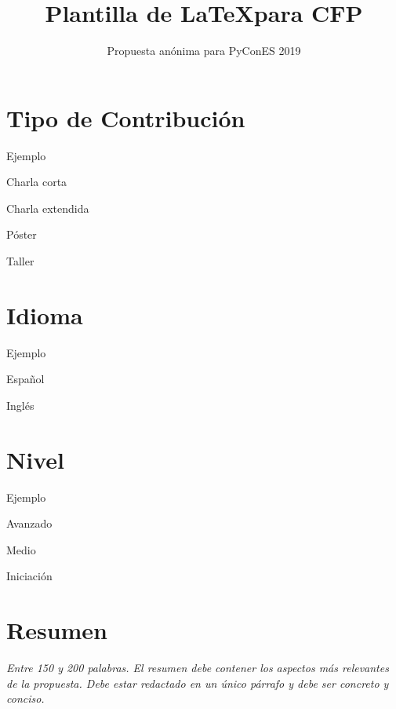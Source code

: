 \documentclass[runningheads]{llncs}
\newcommand{\cmark}{\ding{51}}%
\newcommand{\done}{\rlap{$\square$}{\raisebox{2pt}{\large\hspace{1pt}\cmark}}%
\hspace{-2.5pt}}
\begin{document}
\pagestyle{headings}
\mainmatter


\title{Plantilla de \LaTeX para CFP} %


\author{Propuesta an\'onima para PyConES 2019}

\maketitle

\section{Tipo de Contribuci\'on}

\begin{todolist}
  \item [\done] Ejemplo
  \item Charla corta
  \item Charla extendida
  \item P\'oster
  \item Taller
  \end{todolist}


\section{Idioma}
\begin{todolist}
  \item [\done] Ejemplo
  \item Espa\~nol
  \item Ingl\'es
\end{todolist}
\section{Nivel}

\begin{todolist}
  \item [\done] Ejemplo
  \item Avanzado
  \item Medio
  \item Iniciaci\'on
  \end{todolist}


\newpage

\section{Resumen}
\textit{Entre 150 y 200 palabras. El resumen debe contener los aspectos m\'as relevantes de la propuesta. Debe estar redactado en un \'unico p\'arrafo y debe ser concreto y conciso.}
\end{document}
